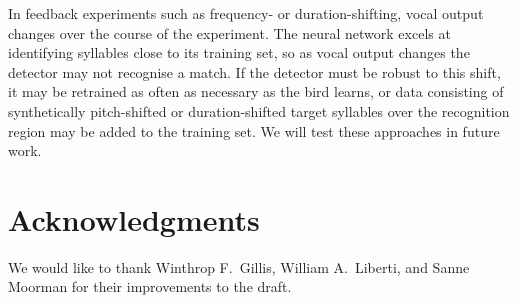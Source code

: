 \documentclass[10pt,letterpaper]{article}
\begin{document}
In feedback experiments such as frequency- or duration-shifting, vocal
output changes over the course of the experiment.  The neural network
excels at identifying syllables close to its training set, so as vocal
output changes the detector may not recognise a match.  If the
detector must be robust to this shift, it may be retrained as often as
necessary as the bird learns, or data consisting of synthetically
pitch-shifted or duration-shifted target syllables over the
recognition region may be added to the training set.  We will test
these approaches in future work.

\section{Acknowledgments}
We would like to thank Winthrop F.~Gillis, William A.~Liberti, and Sanne Moorman for
their improvements to the draft.
\end{document}
